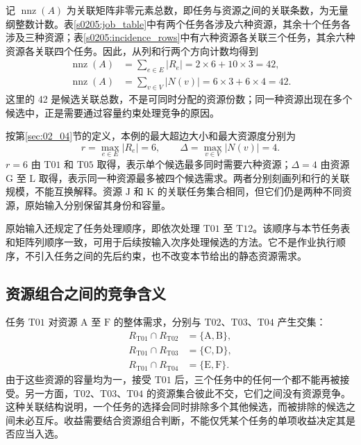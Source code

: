 记 $\operatorname{nnz}(A)$ 为关联矩阵非零元素总数，即任务与资源之间的关联条数，为无量纲整数计数。表\ref{s0205:job_table}中有两个任务各涉及六种资源，其余十个任务各涉及三种资源；表\ref{s0205:incidence_rows}中有六种资源各关联三个任务，其余六种资源各关联四个任务。因此，从列和行两个方向计数均得到
\begin{align}
 \operatorname{nnz}(A)
 &=\sum_{e\in E}|R_e|=2\times6+10\times3=42,
 \label{s0205:nnz_columns}\\
 \operatorname{nnz}(A)
 &=\sum_{v\in V}|N(v)|=6\times3+6\times4=42.
 \label{s0205:nnz_rows}
\end{align}
这里的 42 是候选关联总数，不是可同时分配的资源份数；同一种资源出现在多个候选中，正是需要通过容量约束处理竞争的原因。

按第\ref{sec:02_04}节的定义，本例的最大超边大小和最大资源度分别为
\begin{equation}
 r=\max_{e\in E}|R_e|=6,\qquad
 \Delta=\max_{v\in V}|N(v)|=4.
 \label{s0205:rank_degree}
\end{equation}
$r=6$ 由 $\mathrm{T01}$ 和 $\mathrm{T05}$ 取得，表示单个候选最多同时需要六种资源；$\Delta=4$ 由资源 $\mathrm{G}$ 至 $\mathrm{L}$ 取得，表示同一种资源最多被四个候选需求。两者分别刻画列和行的关联规模，不能互换解释。资源 $\mathrm{J}$ 和 $\mathrm{K}$ 的关联任务集合相同，但它们仍是两种不同资源，原始输入分别保留其身份和容量。

原始输入还规定了任务处理顺序，即依次处理 $\mathrm{T01}$ 至 $\mathrm{T12}$。该顺序与本节任务表和矩阵列顺序一致，可用于后续按输入次序处理候选的方法。它不是作业执行顺序，不引入任务之间的先后约束，也不改变本节给出的静态资源需求。

\subsection{资源组合之间的竞争含义}

任务 $\mathrm{T01}$ 对资源 $\mathrm{A}$ 至 $\mathrm{F}$ 的整体需求，分别与 $\mathrm{T02}$、$\mathrm{T03}$、$\mathrm{T04}$ 产生交集：
\begin{align}
 R_{\mathrm{T01}}\cap R_{\mathrm{T02}}
 &=\{\mathrm{A},\mathrm{B}\},
 \label{s0205:competition_01_02}\\
 R_{\mathrm{T01}}\cap R_{\mathrm{T03}}
 &=\{\mathrm{C},\mathrm{D}\},
 \label{s0205:competition_01_03}\\
 R_{\mathrm{T01}}\cap R_{\mathrm{T04}}
 &=\{\mathrm{E},\mathrm{F}\}.
 \label{s0205:competition_01_04}
\end{align}
由于这些资源的容量均为一，接受 $\mathrm{T01}$ 后，三个任务中的任何一个都不能再被接受。另一方面，$\mathrm{T02}$、$\mathrm{T03}$、$\mathrm{T04}$ 的资源集合彼此不交，它们之间没有资源竞争。这种关联结构说明，一个任务的选择会同时排除多个其他候选，而被排除的候选之间未必互斥。收益需要结合资源组合判断，不能仅凭某个任务的单项收益决定其是否应当入选。

